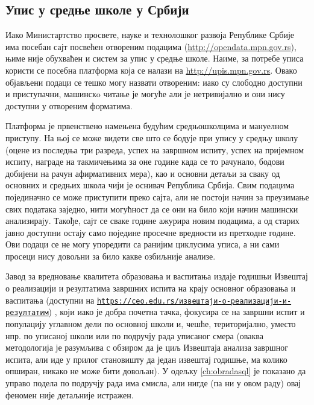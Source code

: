 \subsection{Упис у средње школе у Србији}

Иако Министартство просвете, науке и технолошког развоја Републике Србије има посебан сајт посвећен отвореним подацима (\url{http://opendata.mpn.gov.rs}), њиме није обухваћен и систем за упис у средње школе. Наиме, за потребе уписа користи се посебна платформа која се налази на \url{http://upis.mpn.gov.rs}. Овако објављени подаци се тешко могу назвати отвореним: иако су слободно доступни и приступачни, машинскo читање је могуће али је нетривијално и они нису доступни у отвореним форматима. 

Платформа је првенствено намењена будућим средњошколцима и мануелном приступу. На њој се може видети све што се бодује при упису у средњу школу (оцене из последња три разреда, успех на завршном испиту, успех на пријемном испиту, награде на такмичењима за оне године када се то рачунало, бодови добијени на рачун афирмативних мера), као и основни детаљи за сваку од основних и средњих школа чији је оснивач Република Србија. Свим подацима појединачно се може приступити преко сајта, али не постоји начин за преузимање свих података заједно, нити могућност да се они на било који начин машински анализирају. Такође, сајт се сваке године ажурира новим подацима, а од старих јавно доступни остају само поједине просечне вредности из претходне године. Ови подаци се не могу упоредити са ранијим циклусима уписа, а ни сами просеци нису довољни за било какве озбиљније анализе.

Завод за вредновање квалитета образовања и васпитања издаје годишњи Извештај о реализацији и резултатима завршних испита на крају основног образовања и васпитања (доступни на \texttt{\href{https://ceo.edu.rs/\%D0\%B8\%D0\%B7\%D0\%B2\%D0\%B5\%D1\%88\%D1\%82\%D0\%B0\%D1\%98\%D0\%B8-\%D0\%BE-\%D1\%80\%D0\%B5\%D0\%B0\%D0\%BB\%D0\%B8\%D0\%B7\%D0\%B0\%D1\%86\%D0\%B8\%D1\%98\%D0\%B8-\%D0\%B8-\%D1\%80\%D0\%B5\%D0\%B7\%D1\%83\%D0\%BB\%D1\%82\%D0\%B0\%D1\%82\%D0\%B8\%D0\%BC/}{https://ceo.edu.rs/извештаји-о-реализацији-и-резултатим}}) \citep{izvestaj15}\citep{izvestaj16}\citep{izvestaj17}, који иако је добра почетна тачка, фокусира се на завршни испит и популацију углавном дели по основној школи и, чешће, територијално, уместо нпр. по уписаној школи или по подручју рада уписаног смера (оваква методологија је разумљива с обзиром да је циљ Извештаја анализа завршног испита, али иде у прилог становишту да један извештај годишње, ма колико опширан, никако не може бити довољан). У одељку \ref{ch:obradasql} је показано да управо подела по подручју рада има смисла, али нигде (па ни у овом раду) овај феномен није детаљније истражен.


